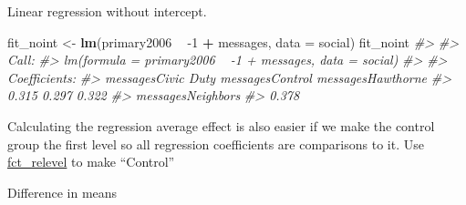 \documentclass[]{book}
\newenvironment{Shaded}{\begin{snugshade}}{\end{snugshade}}
\newcommand{\CommentTok}[1]{\textcolor[rgb]{0.56,0.35,0.01}{\textit{#1}}}
\newcommand{\DataTypeTok}[1]{\textcolor[rgb]{0.13,0.29,0.53}{#1}}
\newcommand{\DecValTok}[1]{\textcolor[rgb]{0.00,0.00,0.81}{#1}}
\newcommand{\KeywordTok}[1]{\textcolor[rgb]{0.13,0.29,0.53}{\textbf{#1}}}
\newcommand{\NormalTok}[1]{#1}
\newcommand{\OperatorTok}[1]{\textcolor[rgb]{0.81,0.36,0.00}{\textbf{#1}}}
\newcommand{\StringTok}[1]{\textcolor[rgb]{0.31,0.60,0.02}{#1}}
\theoremstyle{definition}
\theoremstyle{definition}
\theoremstyle{definition}
\theoremstyle{remark}
\begin{document}
Linear regression without intercept.

\begin{Shaded}
\begin{Highlighting}[]
\NormalTok{fit_noint <-}\StringTok{ }\KeywordTok{lm}\NormalTok{(primary2006 }\OperatorTok{~}\StringTok{ }\DecValTok{-1} \OperatorTok{+}\StringTok{ }\NormalTok{messages, }\DataTypeTok{data =}\NormalTok{ social)}
\NormalTok{fit_noint}
\CommentTok{#> }
\CommentTok{#> Call:}
\CommentTok{#> lm(formula = primary2006 ~ -1 + messages, data = social)}
\CommentTok{#> }
\CommentTok{#> Coefficients:}
\CommentTok{#> messagesCivic Duty     messagesControl   messagesHawthorne  }
\CommentTok{#>              0.315               0.297               0.322  }
\CommentTok{#>  messagesNeighbors  }
\CommentTok{#>              0.378}
\end{Highlighting}
\end{Shaded}

Calculating the regression average effect is also easier if we make the
control group the first level so all regression coefficients are
comparisons to it. Use
\href{https://www.rdocumentation.org/packages/forcats/topics/fct_relevel}{fct\_relevel}
to make ``Control''

\begin{Shaded}
\end{Shaded}

Difference in means
\end{document}
